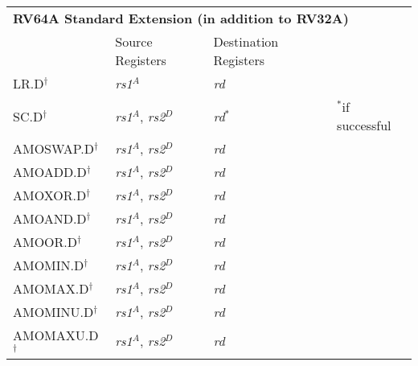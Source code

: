\begin{tabular}{p{25mm}|p{3cm}|p{6cm}|p{10cm}}
  \multicolumn{4}{l}{\bf RV64A Standard Extension (in addition to RV32A)} \\
  \cline{2-3}
   & Source Registers & Destination Registers \\
  \cline{2-3}
   LR.D$^\dagger$ & {\em rs1}$^A$ & {\em rd} &  \\
   \cline{2-3}
   SC.D$^\dagger$ & {\em rs1}$^A$, {\em rs2}$^D$ & {\em rd}$^*$ & $^*$if successful \\
   \cline{2-3}
   AMOSWAP.D$^\dagger$ & {\em rs1}$^A$, {\em rs2}$^D$ & {\em rd} &  \\
   \cline{2-3}
   AMOADD.D$^\dagger$ & {\em rs1}$^A$, {\em rs2}$^D$ & {\em rd} &  \\
   \cline{2-3}
   AMOXOR.D$^\dagger$ & {\em rs1}$^A$, {\em rs2}$^D$ & {\em rd} &  \\
   \cline{2-3}
   AMOAND.D$^\dagger$ & {\em rs1}$^A$, {\em rs2}$^D$ & {\em rd} &  \\
   \cline{2-3}
   AMOOR.D$^\dagger$ & {\em rs1}$^A$, {\em rs2}$^D$ & {\em rd} &  \\
   \cline{2-3}
   AMOMIN.D$^\dagger$ & {\em rs1}$^A$, {\em rs2}$^D$ & {\em rd} &  \\
   \cline{2-3}
   AMOMAX.D$^\dagger$ & {\em rs1}$^A$, {\em rs2}$^D$ & {\em rd} &  \\
   \cline{2-3}
   AMOMINU.D$^\dagger$ & {\em rs1}$^A$, {\em rs2}$^D$ & {\em rd} &  \\
   \cline{2-3}
   AMOMAXU.D$^\dagger$ & {\em rs1}$^A$, {\em rs2}$^D$ & {\em rd} &  \\
   \cline{2-3}
\end{tabular}

